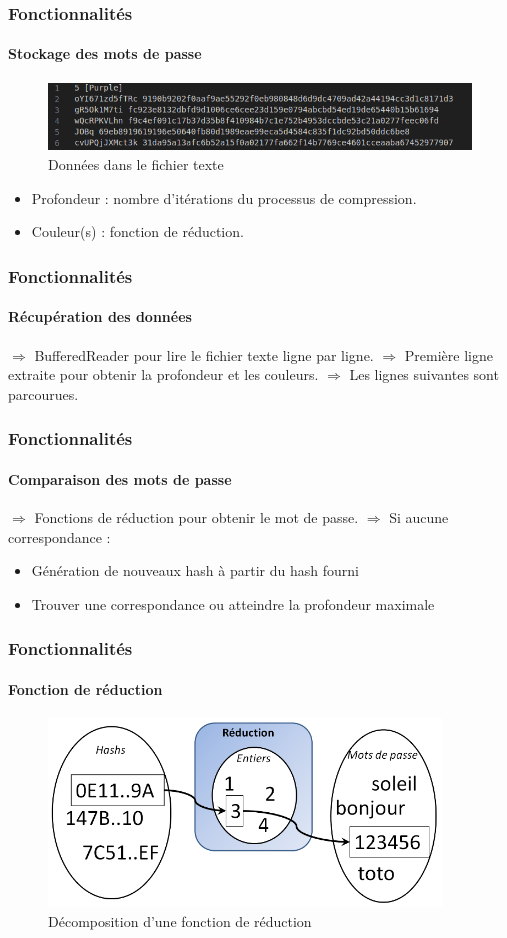 \documentclass{beamer}
\begin{document}
\begin{frame}
\frametitle{Fonctionnalités}
\framesubtitle {Stockage des mots de passe}
\begin{figure}[H]
\centering
\includegraphics[height=1.8cm]{img/mdp.png}
\caption{Données dans le fichier texte}
\end{figure}
\begin{itemize}
    \item Profondeur : nombre d'itérations du processus de compression.
    \item Couleur(s) : fonction de réduction.
\end{itemize}
\end{frame}

\begin{frame}
\frametitle{Fonctionnalités}
\framesubtitle {Récupération des données}
\begin{block}{}
$\Rightarrow$ BufferedReader pour lire le fichier texte ligne par ligne.\newline
$\Rightarrow$ Première ligne extraite pour obtenir la profondeur et les couleurs.\newline
$\Rightarrow$ Les lignes suivantes sont parcourues.
\end{block}
\end{frame}

\begin{frame}
\frametitle{Fonctionnalités}
\framesubtitle {Comparaison des mots de passe}
\begin{block}{}
$\Rightarrow$ Fonctions de réduction pour obtenir le mot de passe.\newline
$\Rightarrow$ Si aucune correspondance :
\begin{itemize}
    \item  Génération de nouveaux hash à partir du hash fourni 
    \item Trouver une correspondance ou atteindre la profondeur maximale
\end{itemize}
\end{block}
\end{frame}

\begin{frame}
\frametitle{Fonctionnalités}
\framesubtitle {Fonction de réduction}
\begin{figure}[H]
    \centering
    \includegraphics[height=5cm]{img/fonction_reduction.png}
    \caption{Décomposition d’une fonction de réduction}
    \end{figure}
\end{frame}
\end{document}
